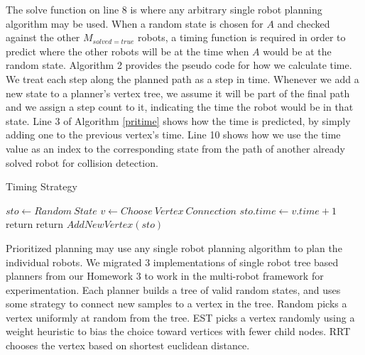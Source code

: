 \documentclass[12pt,journal,compsoc]{IEEEtran}
\begin{document}
The solve function on line 8 is where any arbitrary single robot planning algorithm may be used. When a random state is chosen for $A$ and checked against the other $M_{solved=true}$ robots, a timing function is required in order to predict where the other robots will be at the time when $A$ would be at the random state. Algorithm 2 provides the pseudo code for how we calculate time. We treat each step along the planned path as a step in time. Whenever we add a new state to a planner's vertex tree, we assume it will be part of the final path and we assign a step count to it, indicating the time the robot would be in that state. Line 3 of Algorithm \ref{pritime} shows how the time is predicted, by simply adding one to the previous vertex's time. Line 10 shows how we use the time value as an index to the corresponding state from the path of another already solved robot for collision detection.

\begin{algorithm}
\caption{Timing Strategy}\label{pritime}
\begin{algorithmic}[1]
\State $sto \gets Random~State$
\State $v \gets Choose~Vertex~Connection$
\State $sto.time \gets v.time + 1$
\State return
\EndIf
\EndFor
{}
\State return
\EndIf
\EndFor
\State $AddNewVertex(sto)$
\end{algorithmic}
\end{algorithm}

\par
Prioritized planning may use any single robot planning algorithm to plan the individual robots. We migrated 3 implementations of single robot tree based planners from our Homework 3 to work in the multi-robot framework for experimentation. Each planner builds a tree of valid random states, and uses some strategy to connect new samples to a vertex in the tree. Random picks a vertex uniformly at random from the tree. EST picks a vertex randomly using a weight heuristic to bias the choice toward vertices with fewer child nodes. RRT chooses the vertex based on shortest euclidean distance.
\end{document}
